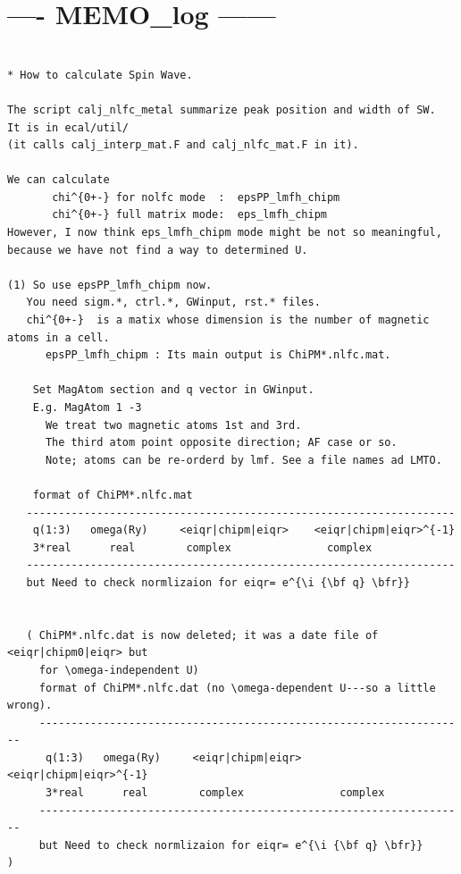 \documentclass[a4paper,10pt,epsf,fleqn]{article}
\newcommand{\bfr}{{\bf r}}
\newcommand{\figp}[1]{\rotatebox{-90}{\texttt{[image: \#1]}}}
\begin{document}
{{{%


%


\newpage
\section{---- MEMO\_log ------}
\begin{verbatim}

* How to calculate Spin Wave.

The script calj_nlfc_metal summarize peak position and width of SW.
It is in ecal/util/
(it calls calj_interp_mat.F and calj_nlfc_mat.F in it).

We can calculate 
       chi^{0+-} for nolfc mode  :  epsPP_lmfh_chipm
       chi^{0+-} full matrix mode:  eps_lmfh_chipm
However, I now think eps_lmfh_chipm mode might be not so meaningful, 
because we have not find a way to determined U.

(1) So use epsPP_lmfh_chipm now. 
   You need sigm.*, ctrl.*, GWinput, rst.* files.
   chi^{0+-}  is a matix whose dimension is the number of magnetic atoms in a cell.
      epsPP_lmfh_chipm : Its main output is ChiPM*.nlfc.mat.

    Set MagAtom section and q vector in GWinput.
    E.g. MagAtom 1 -3 
      We treat two magnetic atoms 1st and 3rd.
      The third atom point opposite direction; AF case or so.
      Note; atoms can be re-orderd by lmf. See a file names ad LMTO.

    format of ChiPM*.nlfc.mat
   -------------------------------------------------------------------
    q(1:3)   omega(Ry)     <eiqr|chipm|eiqr>    <eiqr|chipm|eiqr>^{-1}
    3*real      real        complex               complex
   -------------------------------------------------------------------
   but Need to check normlizaion for eiqr= e^{\i {\bf q} \bfr}}


   ( ChiPM*.nlfc.dat is now deleted; it was a date file of <eiqr|chipm0|eiqr> but 
     for \omega-independent U)
     format of ChiPM*.nlfc.dat (no \omega-dependent U---so a little wrong).
     -------------------------------------------------------------------
      q(1:3)   omega(Ry)     <eiqr|chipm|eiqr>    <eiqr|chipm|eiqr>^{-1}
      3*real      real        complex               complex
     -------------------------------------------------------------------
     but Need to check normlizaion for eiqr= e^{\i {\bf q} \bfr}}         )



\end{verbatim}}}}
\end{document}
